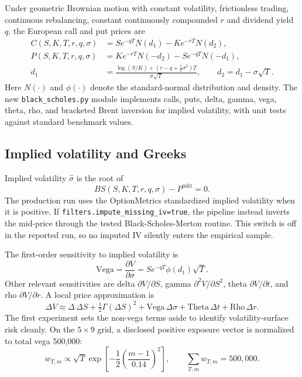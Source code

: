 \documentclass[11pt,a4paper]{article}
\newcommand{\code}[1]{\texttt{#1}}
\begin{document}
Under geometric Brownian motion with constant volatility, frictionless trading, continuous
rebalancing, constant continuously compounded $r$ and dividend yield $q$, the European call and put
prices are
\begin{align}
C(S,K,T,r,q,\sigma)&=Se^{-qT}N(d_1)-Ke^{-rT}N(d_2),\\
P(S,K,T,r,q,\sigma)&=Ke^{-rT}N(-d_2)-Se^{-qT}N(-d_1),\\
d_1&=\frac{\log(S/K)+(r-q+\tfrac12\sigma^2)T}{\sigma\sqrt{T}},
\qquad d_2=d_1-\sigma\sqrt{T}.
\end{align}
Here $N(\cdot)$ and $\phi(\cdot)$ denote the standard-normal distribution and density. The new
\code{black\_scholes.py} module implements calls, puts, delta, gamma, vega, theta, rho, and bracketed
Brent inversion for implied volatility, with unit tests against standard benchmark values.

\subsection{Implied volatility and Greeks}

Implied volatility $\widehat\sigma$ is the root of
\begin{equation}
BS(S,K,T,r,q,\widehat\sigma)-P^{\mathrm{mkt}}=0.
\end{equation}
The production run uses the OptionMetrics standardized implied volatility when it is positive. If
\code{filters.impute\_missing\_iv=true}, the pipeline instead inverts the mid-price through the tested
Black-Scholes-Merton routine. This switch is off in the reported run, so no imputed IV silently enters
the empirical sample.

The first-order sensitivity to implied volatility is
\begin{equation}
\mathrm{Vega}=\frac{\partial V}{\partial\sigma}=Se^{-qT}\phi(d_1)\sqrt{T}.
\end{equation}
Other relevant sensitivities are delta $\partial V/\partial S$, gamma
$\partial^2V/\partial S^2$, theta $\partial V/\partial t$, and rho $\partial V/\partial r$. A local
price approximation is
\begin{equation}
\Delta V\approx \Delta\,\Delta S+\tfrac12\Gamma(\Delta S)^2+\mathrm{Vega}\,\Delta\sigma
+\mathrm{Theta}\,\Delta t+\mathrm{Rho}\,\Delta r.
\end{equation}
The first experiment sets the non-vega terms aside to identify volatility-surface risk cleanly. On
the $5\times9$ grid, a disclosed positive exposure vector is normalized to total vega 500,000:
\begin{equation}
w_{T,m}\propto \sqrt{T}\exp\!\left[-\frac12\left(\frac{m-1}{0.14}\right)^2\right],
\qquad \sum_{T,m}w_{T,m}=500{,}000.
\end{equation}
\end{document}
